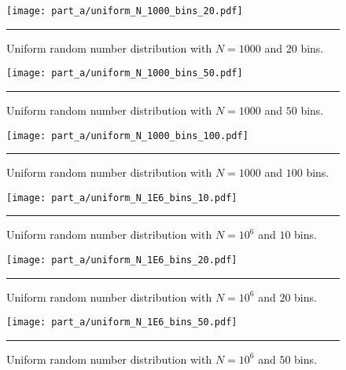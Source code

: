 \documentclass[notitlepage,aps,prd,nofootinbib]{revtex4-1}
\begin{document}
\begin{figure}[!htbc]
  \centering
  \texttt{[image: part\_a/uniform\_N\_1000\_bins\_20.pdf]}
	{\par\nobreak\rule[9pt]{35em}{0.5pt}\vspace{-5mm}}
	\caption{Uniform random number distribution with $N = 1000$ and $20$ bins.}
	\label{fig:uniform_N_1000_bins_20}
\end{figure}

\begin{figure}[!htbc]
  \centering
  \texttt{[image: part\_a/uniform\_N\_1000\_bins\_50.pdf]}
	{\par\nobreak\rule[9pt]{35em}{0.5pt}\vspace{-5mm}}
	\caption{Uniform random number distribution with $N = 1000$ and $50$ bins.}
	\label{fig:uniform_N_1000_bins_50}
\end{figure}

\begin{figure}[!htbc]
  \centering
  \texttt{[image: part\_a/uniform\_N\_1000\_bins\_100.pdf]}
	{\par\nobreak\rule[9pt]{35em}{0.5pt}\vspace{-5mm}}
	\caption{Uniform random number distribution with $N = 1000$ and $100$ bins.}
	\label{fig:uniform_N_1000_bins_100}
\end{figure}

\clearpage

\begin{figure}[!htbc]
  \centering
  \texttt{[image: part\_a/uniform\_N\_1E6\_bins\_10.pdf]}
	{\par\nobreak\rule[9pt]{35em}{0.5pt}\vspace{-5mm}}
	\caption{Uniform random number distribution with $N = 10^6$ and $10$ bins.}
	\label{fig:uniform_N_1E6_bins_10}
\end{figure}

\begin{figure}[!htbc]
  \centering
  \texttt{[image: part\_a/uniform\_N\_1E6\_bins\_20.pdf]}
	{\par\nobreak\rule[9pt]{35em}{0.5pt}\vspace{-5mm}}
	\caption{Uniform random number distribution with $N = 10^6$ and $20$ bins.}
	\label{fig:uniform_N_1E6_bins_20}
\end{figure}

\begin{figure}[!htbc]
  \centering
  \texttt{[image: part\_a/uniform\_N\_1E6\_bins\_50.pdf]}
	{\par\nobreak\rule[9pt]{35em}{0.5pt}\vspace{-5mm}}
	\caption{Uniform random number distribution with $N = 10^6$ and $50$ bins.}
	\label{fig:uniform_N_1E6_bins_50}
\end{figure}
\end{document}

